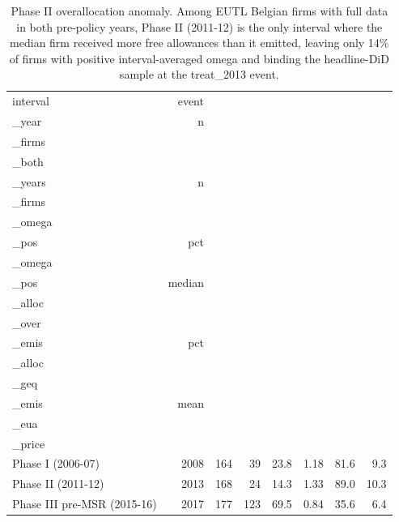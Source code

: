 \begin{table}[ht]
\centering
\caption{Phase II overallocation anomaly. Among EUTL Belgian firms with full data in both pre-policy years, Phase II (2011-12) is the only interval where the median firm received more free allowances than it emitted, leaving only 14\% of firms with positive interval-averaged omega and binding the headline-DiD sample at the treat\_2013 event.} 
\label{tab:phase2-overallocation}
\begin{tabular}{lrrrrrrr}
  \toprule
interval & event\\_year & n\\_firms\\_both\\_years & n\\_firms\\_omega\\_pos & pct\\_omega\\_pos & median\\_alloc\\_over\\_emis & pct\\_alloc\\_geq\\_emis & mean\\_eua\\_price \\ 
  \midrule
Phase I (2006-07) & 2008 & 164 & 39 & 23.8 & 1.18 & 81.6 & 9.3 \\ 
  Phase II (2011-12) & 2013 & 168 & 24 & 14.3 & 1.33 & 89.0 & 10.3 \\ 
  Phase III pre-MSR (2015-16) & 2017 & 177 & 123 & 69.5 & 0.84 & 35.6 & 6.4 \\ 
   \bottomrule
\end{tabular}
\end{table}
